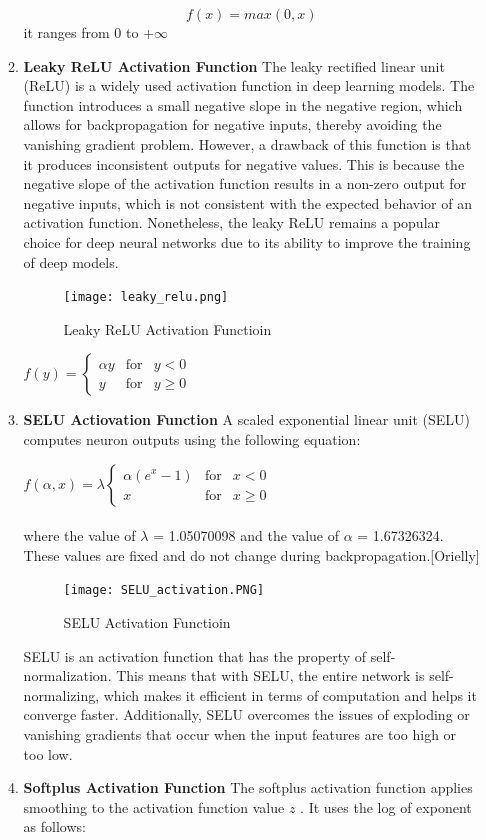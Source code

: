 \begin{itemize}
\begin{enumerate}
    
    $$f(x)=max(0,x)$$
    it ranges from 0 to +$\infty$\\
    \item  \textbf{Leaky ReLU Activation Function}
    The leaky rectified linear unit (ReLU) is a widely used activation function in deep learning models. The function introduces a small negative slope in the negative region, which allows for backpropagation for negative inputs, thereby avoiding the vanishing gradient problem. However, a drawback of this function is that it produces inconsistent outputs for negative values. This is because the negative slope of the activation function results in a non-zero output for negative inputs, which is not consistent with the expected behavior of an activation function. Nonetheless, the leaky ReLU remains a popular choice for deep neural networks due to its ability to improve the training of deep models.
    \begin{figure}[H]
        \centering\texttt{[image: leaky\_relu.png]}
        \caption{Leaky ReLU Activation Functioin}
    \end{figure}
    
    $f(y)=\left\{\begin{array}{rcl}
         \alpha y & \mbox{for} & y<0\\
         y & \mbox{for} & y\geq 0
    \end{array}\right.$\\
    \item \textbf{SELU Actiovation Function}
    A scaled exponential linear unit (SELU) computes neuron outputs using the following equation:
    
    $f(\alpha,x)=\lambda\left\{\begin{array}{rcl}
         \alpha (e^{x}-1) & \mbox{for} & x<0\\
          x & \mbox{for} & x\geq 0
    \end{array}\right.$\\
    \\
    where the value of $\lambda$ = 1.05070098 and the value of $\alpha$ = 1.67326324. These values are fixed and do not change during backpropagation.[Orielly]
    \begin{figure}[H]
        \centering\texttt{[image: SELU\_activation.PNG]}
        \caption{SELU Activation Functioin}
    \end{figure}
    
   SELU is an activation function that has the property of self-normalization. This means that with SELU, the entire network is self-normalizing, which makes it efficient in terms of computation and helps it converge faster. Additionally, SELU overcomes the issues of exploding or vanishing gradients that occur when the input features are too high or too low.
    \item \textbf{Softplus Activation Function}
    The softplus activation function applies smoothing to the activation function value 
    \(z\) . It uses the log of exponent as follows:\\
    

\end{enumerate}
\end{itemize}
